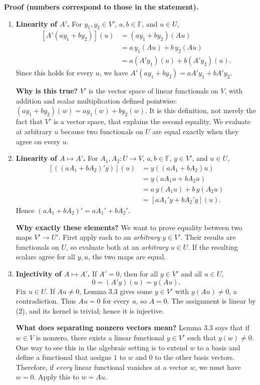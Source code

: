 \documentclass[11pt,a4paper]{article}
\newcommand{\F}{\mathbb F}
\newenvironment{proofsteps}{\begin{enumerate}\setlength{\itemsep}{4pt}}{\end{enumerate}}
\begin{document}
\textbf{Proof (numbers correspond to those in the statement).}
\begin{proofsteps}
\item \textbf{Linearity of \(A'\).} For \(y_1,y_2\in V'\), \(a,b\in\F\), and \(u\in U\),
\[
 \begin{aligned}
 [A'(ay_1+by_2)](u)
 &=(ay_1+by_2)(Au)\\
 &=a\,y_1(Au)+b\,y_2(Au)\\
 &=a(A'y_1)(u)+b(A'y_2)(u).
 \end{aligned}
\]
Since this holds for every \(u\), we have \(A'(ay_1+by_2)=aA'y_1+bA'y_2\).
\begin{personalnote}
\textbf{Why is this true?} \(V'\) is the vector space of linear functionals on \(V\), with addition and scalar multiplication defined pointwise:
\((ay_1+by_2)(w)=ay_1(w)+by_2(w)\).
It is this definition, not merely the fact that \(V'\) is a vector space, that explains the second equality. We evaluate at arbitrary \(u\) because two functionals on \(U\) are equal exactly when they agree on every \(u\).
\end{personalnote}

\item \textbf{Linearity of \(A\mapsto A'\).} For \(A_1,A_2:U\to V\), \(a,b\in\F\), \(y\in V'\), and \(u\in U\),
\[
 \begin{aligned}
 [((aA_1+bA_2)'y)](u)
 &=y((aA_1+bA_2)u)\\
 &=y(aA_1u+bA_2u)\\
 &=a\,y(A_1u)+b\,y(A_2u)\\
 &=[aA_1'y+bA_2'y](u).
 \end{aligned}
\]
Hence \((aA_1+bA_2)'=aA_1'+bA_2'\).
\begin{personalnote}
\textbf{Why exactly these elements?} We want to prove equality between two maps \(V'\to U'\). First apply each to an \emph{arbitrary} \(y\in V'\). Their results are functionals on \(U\), so evaluate both at an \emph{arbitrary} \(u\in U\). If the resulting scalars agree for all \(y,u\), the two maps are equal.
\end{personalnote}

\item \textbf{Injectivity of \(A\mapsto A'\).}
If \(A'=0\), then for all \(y\in V'\) and all \(u\in U\),
\[
 0=(A'y)(u)=y(Au).
\]
Fix \(u\in U\). If \(Au\neq0\), Lemma 3.3 gives some \(y\in V'\) with \(y(Au)\neq0\), a contradiction. Thus \(Au=0\) for every \(u\), so \(A=0\). The assignment is linear by (2), and its kernel is trivial; hence it is injective.
\begin{personalnote}
\textbf{What does separating nonzero vectors mean?} Lemma 3.3 says that if \(w\in V\) is nonzero, there exists a linear functional \(y\in V'\) such that \(y(w)\neq0\). One way to see this in the algebraic setting is to extend \(w\) to a basis and define a functional that assigns \(1\) to \(w\) and \(0\) to the other basis vectors. Therefore, if \emph{every} linear functional vanishes at a vector \(w\), we must have \(w=0\). Apply this to \(w=Au\).
\end{personalnote}


\end{proofsteps}
\end{document}
